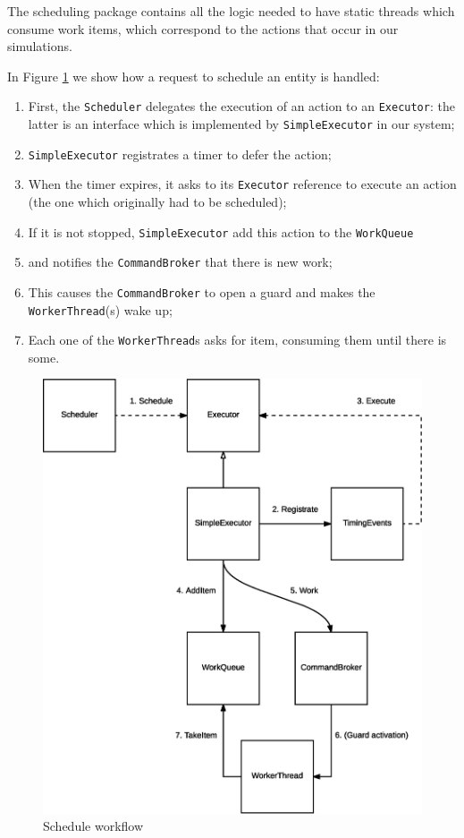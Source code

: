 The scheduling package contains all the logic needed to have static threads
which consume work items, which correspond to the actions that occur in our
simulations.

In Figure \ref{fig:schedule-workflow} we show how a request to schedule an
entity is handled:

\begin{enumerate}
  \item First, the \texttt{Scheduler} delegates the execution of an action to an
    \texttt{Executor}: the latter is an interface which is implemented by
    \texttt{SimpleExecutor} in our system;
  \item \texttt{SimpleExecutor} registrates a timer to defer the action;
  \item When the timer expires, it asks to its \texttt{Executor} reference to
    execute an action (the one which originally had to be scheduled);
  \item If it is not stopped, \texttt{SimpleExecutor} add this action to the
    \texttt{WorkQueue}
  \item and notifies the \texttt{CommandBroker} that there is new work;
  \item This causes the \texttt{CommandBroker} to open a guard and makes the
    \texttt{WorkerThread}(s) wake up;
  \item Each one of the \texttt{WorkerThread}s asks for item, consuming them
    until there is some.
\end{enumerate}

\begin{figure}[H]
\centering
\includegraphics[scale=0.4,keepaspectratio]{images/solution/app/backend/scheduler.eps}
\caption{Schedule workflow}
\label{fig:schedule-workflow}
\end{figure}

